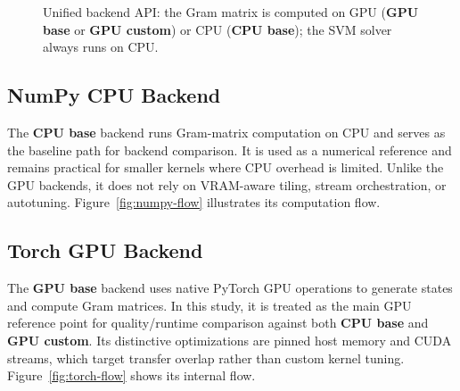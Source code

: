 \documentclass[10pt,twocolumn,letterpaper]{article}
\begin{document}
\begin{figure}[t]
\centering
{}
\caption{Unified backend API: the Gram matrix is computed on GPU (\textbf{GPU base} or \textbf{GPU custom}) or CPU (\textbf{CPU base}); 
the SVM solver always runs on CPU.}
\label{fig:backend-api}
\end{figure}

\subsection{NumPy CPU Backend}
The \textbf{CPU base} backend runs Gram-matrix computation on CPU and serves as the baseline path for backend comparison.
It is used as a numerical reference and remains practical for smaller kernels where CPU overhead is limited.
Unlike the GPU backends, it does not rely on VRAM-aware tiling, stream orchestration, or autotuning.
Figure~\ref{fig:numpy-flow} illustrates its computation flow.

\subsection{Torch GPU Backend}
The \textbf{GPU base} backend uses native PyTorch GPU operations to generate states and compute Gram matrices. 
In this study, it is treated as the main GPU reference point for quality/runtime comparison against 
both \textbf{CPU base} and \textbf{GPU custom}.
Its distinctive optimizations are pinned host memory and CUDA streams, which target transfer overlap 
rather than custom kernel tuning.
Figure~\ref{fig:torch-flow} shows its internal flow.
\end{document}
